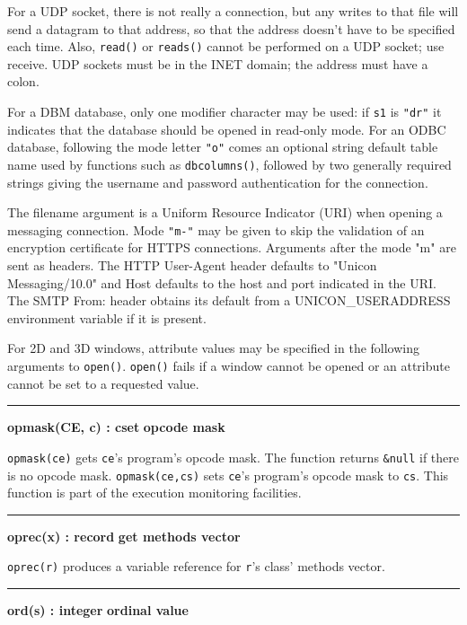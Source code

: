 For a UDP socket, there is not really a connection, but any writes to
that file will send a datagram to that address, so that the address
doesn't have to be specified each time. Also,
\texttt{read()} or \texttt{reads()} cannot be performed on a UDP
socket; use receive. UDP sockets must be in the INET domain; the
address must have a colon. 

For a DBM database, only one modifier character may be used: if
\texttt{s1} is \texttt{"dr"} it indicates that the database should be
opened in read-only mode.  For an ODBC database, following the mode
letter \texttt{"o"} comes an optional string default table name used
by functions such as \texttt{dbcolumns()}, followed by two generally
required strings giving the username and password authentication for the
connection.

The filename argument is a Uniform Resource Indicator (URI) when opening
a messaging connection. Mode \texttt{"m-"} may be given to skip the
validation of an encryption certificate for HTTPS connections.
Arguments after the mode "m" are sent as headers. The HTTP
User-Agent header defaults to "Unicon
Messaging/10.0" and Host defaults to the host and port
indicated in the URI. The SMTP From: header obtains its default from a
UNICON\_USERADDRESS environment variable if it is present.

For 2D and 3D windows, attribute values may be specified in the
following arguments to \texttt{open()}. \texttt{open()} fails if a
window cannot be opened or an attribute cannot be set to a requested
value.

\bigskip\hrule\vspace{0.1cm}
\noindent
{\bf opmask(CE, c) : cset } \hfill {\bf opcode mask}

\noindent
\texttt{opmask(ce)} gets \texttt{ce}'s
program's opcode mask. The function returns
\texttt{\&null} if there is no opcode mask. \texttt{opmask(ce,cs)} sets
\texttt{ce}'s program's opcode mask
to \texttt{cs}. This function is part of the execution monitoring
facilities.

\bigskip\hrule\vspace{0.1cm}
\noindent
{\bf oprec(x) : record } \hfill {\bf get methods vector}

\noindent
\texttt{oprec(r)} produces a variable reference for
\texttt{r}'s class' methods vector.

\bigskip\hrule\vspace{0.1cm}
\noindent
{\bf ord(s) : integer } \hfill {\bf ordinal value}

